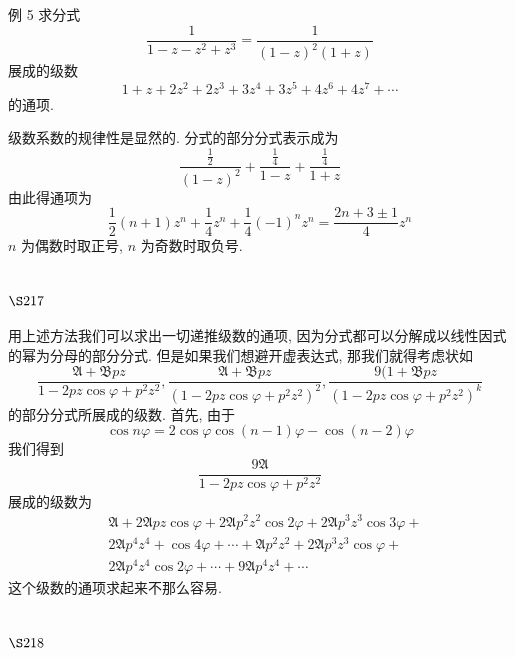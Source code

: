 例 5 求分式
\[
\frac{1}{1-z-z^{2}+z^{3}}=\frac{1}{(1-z)^{2}(1+z)}
\]
展成的级数
\[
1+z+2 z^{2}+2 z^{3}+3 z^{4}+3 z^{5}+4 z^{6}+4 z^{7}+\cdots
\]
的通项.

级数系数的规律性是显然的. 分式的部分分式表示成为
\[
\frac{\frac{1}{2}}{(1-z)^{2}}+\frac{\frac{1}{4}}{1-z}+\frac{\frac{1}{4}}{1+z}
\]
由此得通项为
\[
\frac{1}{2}(n+1) z^{n}+\frac{1}{4} z^{n}+\frac{1}{4}(-1)^{n} z^{n}=\frac{2 n+3 \pm 1}{4} z^{n}
\]
$n$ 为偶数时取正号, $n$ 为奇数时取负号.

\section{$\S 217$}

用上述方法我们可以求出一切递推级数的通项, 因为分式都可以分解成以线性因式 的幂为分母的部分分式. 但是如果我们想避开虚表达式, 那我们就得考虑状如 
\[
 \frac{\mathfrak{A}+\mathfrak{B} p z}{1-2 p z \cos \varphi+p^{2} z^{2}}, \frac{\mathfrak{A}+\mathfrak{B} p z}{\left(1-2 p z \cos \varphi+p^{2} z^{2}\right)^{2}}, \frac{9(1+\mathfrak{B} p z}{\left(1-2 p z \cos \varphi+p^{2} z^{2}\right)^{k}}
\]
的部分分式所展成的级数. 首先, 由于
\[
\cos n \varphi=2 \cos \varphi \cos (n-1) \varphi-\cos (n-2) \varphi
\]
我们得到
\[
\frac{9 \mathfrak{A}}{1-2 p z \cos \varphi+p^{2} z^{2}}
\]
展成的级数为
\[
\begin{aligned}
& \mathfrak{A}+2 \mathfrak{A} p z \cos \varphi+2 \mathfrak{A} p^{2} z^{2} \cos 2 \varphi+2 \mathfrak{A} p^{3} z^{3} \cos 3 \varphi+ \\
& 2 \mathfrak{A} p^{4} z^{4}+\cos 4 \varphi+\cdots+\mathfrak{A} p^{2} z^{2}+2 \mathfrak{A} p^{3} z^{3} \cos \varphi+ \\
& 2 \mathfrak{A} p^{4} z^{4} \cos 2 \varphi+\cdots+9 \mathfrak{A} p^{4} z^{4}+\cdots
\end{aligned}
\]
这个级数的通项求起来不那么容易.

\section{$\S 218$}

